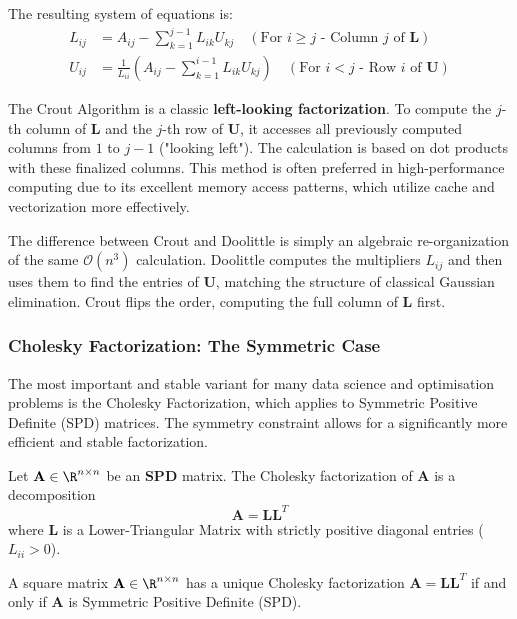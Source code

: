 The resulting system of equations is:
\begin{align} L_{ij} &= A_{ij} - \sum_{k=1}^{j-1} L_{ik} U_{kj} \quad (\text{For } i \ge j \text{ - Column } j \text{ of } \mathbf{L}) \\ U_{ij} &= \frac{1}{L_{ii}} \left( A_{ij} - \sum_{k=1}^{i-1} L_{ik} U_{kj} \right) \quad (\text{For } i < j \text{ - Row } i \text{ of } \mathbf{U}) \end{align}

The Crout Algorithm is a classic \textbf{left-looking factorization}. To compute the $j$-th column of $\mathbf{L}$ and the $j$-th row of $\mathbf{U}$, it accesses all previously computed columns from $1$ to $j-1$ ("looking left"). The calculation is based on dot products with these finalized columns. This method is often preferred in high-performance computing due to its excellent memory access patterns, which utilize cache and vectorization more effectively.

\begin{remark}
The difference between Crout and Doolittle is simply an algebraic re-organization of the same $\mathcal{O}(n^3)$ calculation. Doolittle computes the multipliers $L_{ij}$ and then uses them to find the entries of $\mathbf{U}$, matching the structure of classical Gaussian elimination. Crout flips the order, computing the full column of $\mathbf{L}$ first.
\end{remark}

\subsubsection{Cholesky Factorization: The Symmetric Case}

The most important and stable variant for many data science and optimisation problems is the Cholesky Factorization, which applies to Symmetric Positive Definite (SPD) matrices. The symmetry constraint allows for a significantly more efficient and stable factorization.

\begin{definition}
Let $\mathbf{A} \in \R^{n \times n}$ be an $\mathbf{SPD}$ matrix. The Cholesky factorization of $\mathbf{A}$ is a decomposition
\[ \mathbf{A} = \mathbf{L}\mathbf{L}^T \]
where $\mathbf{L}$ is a Lower-Triangular Matrix with strictly positive diagonal entries ($L_{ii} > 0$).
\end{definition}

\begin{theorem}
A square matrix $\mathbf{A} \in \R^{n \times n}$ has a unique Cholesky factorization $\mathbf{A} = \mathbf{L}\mathbf{L}^T$ if and only if $\mathbf{A}$ is Symmetric Positive Definite (SPD).
\end{theorem}

